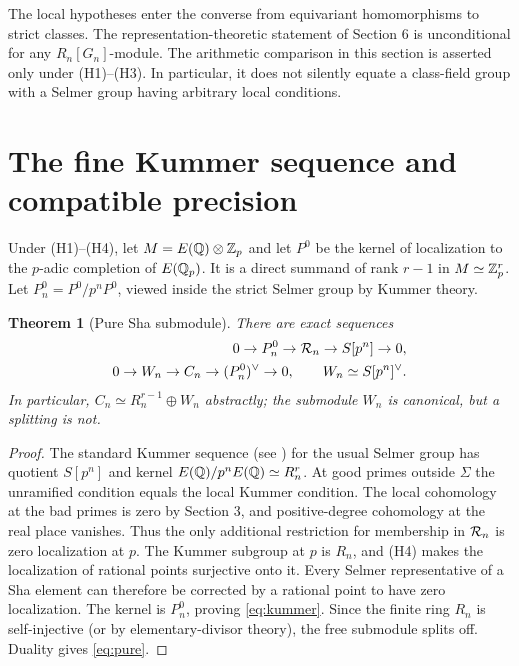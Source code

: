 \documentclass[11pt,a4paper]{article}
\newtheorem{theorem}{Theorem}[section]
\theoremstyle{definition}\newtheorem{definition}[theorem]{Definition}
\theoremstyle{remark}\newtheorem{remark}[theorem]{Remark}
\numberwithin{equation}{section}
\begin{document}
\noindent The local hypotheses enter the converse from equivariant homomorphisms to strict classes. The representation-theoretic statement of Section 6 is unconditional for any $R_n[G_n]$-module. The arithmetic comparison in this section is asserted only under (H1)--(H3). In particular, it does not silently equate a class-field group with a Selmer group having arbitrary local conditions.


\section{The fine Kummer sequence and compatible precision}\label{sec:pure}
Under (H1)--(H4), let $M=E(\mathbb Q)\otimes\mathbb Z_p$ and let $P^0$ be the kernel of localization to the $p$-adic completion of $E(\mathbb Q_p)$. It is a direct summand of rank $r-1$ in $M\simeq\mathbb Z_p^r$. Let $P_n^0=P^0/p^nP^0$, viewed inside the strict Selmer group by Kummer theory.

\begin{theorem}[Pure Sha submodule]\label{th:pure}
There are exact sequences
\begin{align}
0\to P_n^0\to\mathcal R_n\to S[p^n]\to0,\label{eq:kummer}\\
0\to W_n\to C_n\to(P_n^0)^\vee\to0,\qquad
W_n\simeq S[p^n]^\vee.\label{eq:pure}
\end{align}
In particular, $C_n\simeq R_n^{r-1}\oplus W_n$ abstractly; the submodule $W_n$ is canonical, but a splitting is not.
\end{theorem}
\begin{proof}
The standard Kummer sequence (see \cite{Silverman,MR}) for the usual Selmer group has quotient $S[p^n]$ and kernel $E(\mathbb Q)/p^nE(\mathbb Q)\simeq R_n^r$. At good primes outside $\Sigma$ the unramified condition equals the local Kummer condition. The local cohomology at the bad primes is zero by Section 3, and positive-degree cohomology at the real place vanishes. Thus the only additional restriction for membership in $\mathcal R_n$ is zero localization at $p$. The Kummer subgroup at $p$ is $R_n$, and (H4) makes the localization of rational points surjective onto it. Every Selmer representative of a Sha element can therefore be corrected by a rational point to have zero localization. The kernel is $P_n^0$, proving \eqref{eq:kummer}. Since the finite ring $R_n$ is self-injective (or by elementary-divisor theory), the free submodule splits off. Duality gives \eqref{eq:pure}.\end{proof}
\end{document}
